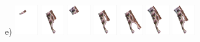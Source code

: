 \begin{figure}[p]
e) \includegraphics[width=0.09\textwidth]{figs/n1_mvf.png}
\includegraphics[width=0.09\textwidth]{figs/n2_mvf.png}
\includegraphics[width=0.09\textwidth]{figs/n3_mvf.png}
\includegraphics[width=0.09\textwidth]{figs/n4_mvf.png}
\includegraphics[width=0.09\textwidth]{figs/n5_mvf.png}
\includegraphics[width=0.09\textwidth]{figs/n6_mvf.png}
\includegraphics[width=0.09\textwidth]{figs/n7_mvf.png}

\end{figure}
